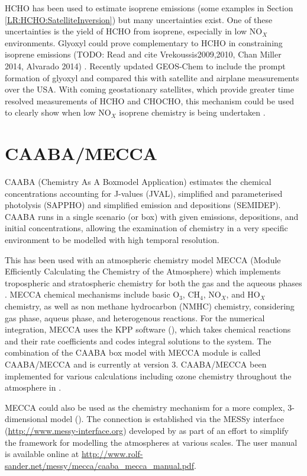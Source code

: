     HCHO has been used to estimate isoprene emissions (some examples in Section \ref{LR:HCHO:SatelliteInversion}) but many uncertainties exist.
    One of these uncertainties is the yield of HCHO from isoprene, especially in low NO$_X$ environments.
    Glyoxyl could prove complementary to HCHO in constraining isoprene emissions (TODO: Read and cite Vrekoussis2009,2010, Chan Miller 2014, Alvarado 2014) \citep{Miller2017}.
    Recently \cite{Miller2017} updated GEOS-Chem to include the prompt formation of glyoxyl and compared this with satellite and airplane measurements over the USA.
    With coming geostationary satellites, which provide greater time resolved measurements of HCHO and CHOCHO, this mechanism could be used to clearly show when low NO$_X$ isoprene chemistry is being undertaken \citep{Miller2017}.
    
  
  \section{CAABA/MECCA}
    \label{Model:CM}
    
    CAABA (Chemistry As A Boxmodel Application) estimates the chemical concentrations accounting for J-values (JVAL), simplified and parameterised photolysis (SAPPHO) and simplified emission and depositions (SEMIDEP).
    CAABA runs in a single scenario (or box) with given emissions, depositions, and initial concentrations, allowing the examination of chemistry in a very specific environment to be modelled with high temporal resolution.
    
    This has been used with an atmospheric chemistry model MECCA (Module Efficiently Calculating the Chemistry of the Atmosphere) which implements tropospheric and stratospheric chemistry for both the gas and the aqueous phases \citep{Sander2005}.
    MECCA chemical mechanisms include basic O$_3$, CH$_4$, NO$_X$, and HO$_X$ chemistry, as well as non methane hydrocarbon (NMHC) chemistry, considering gas phase, aqueus phase, and heterogenous reactions. \citep{Sander2005}
    For the numerical integration, MECCA uses the KPP software (\cite{SanduSander2006}), which takes chemical reactions and their rate coefficients and codes integral solutions to the system.
    The combination of the CAABA box model with MECCA module is called CAABA/MECCA and is currently at version 3.
    CAABA/MECCA been implemented for various calculations including ozone chemistry throughout the atmosphere in \cite{Zanis2014}.
    
    MECCA could also be used as the chemistry mechanism for a more complex, 3-dimensional model (\cite[e.g.][]{Jockel2006}).
    The connection is established via the MESSy interface (\url{http://www.messy-interface.org}) developed by \cite{Jockel2005} as part of an effort to simplify the framework for modelling the atmospheres at various scales.
    The user manual is available online at \url{http://www.rolf-sander.net/messy/mecca/caaba_mecca_manual.pdf}.